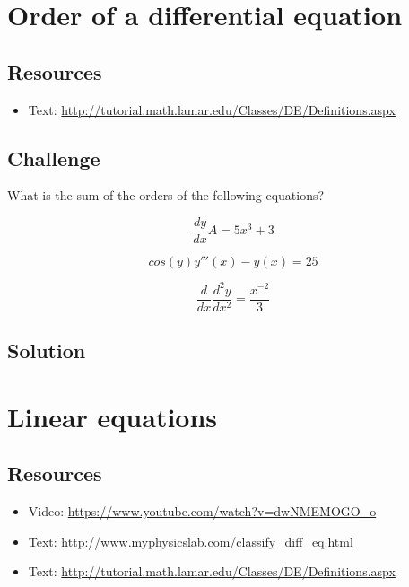 \section{Order of a differential equation}

\subsection*{Resources}
\begin{itemize}
    \item Text: \url{http://tutorial.math.lamar.edu/Classes/DE/Definitions.aspx}
\end{itemize}

\subsection*{Challenge}
What is the sum of the orders of the following equations?

\begin{equation}
    \frac{dy}{dx}A = 5x^3 + 3
\end{equation}

\begin{equation}
    cos(y) y'''(x) - y(x) = 25
\end{equation}

\begin{equation}
    \frac{d}{dx} \frac{d^2 y}{dx^2} = \frac{x^{-2}}{3}
\end{equation}

\subsection*{Solution}
\six{}


\timebox


\newpage

\section{Linear equations}

\subsection*{Resources}
\begin{itemize}
    \item Video: \url{https://www.youtube.com/watch?v=dwNMEMOGO_o}
    \item Text: \url{http://www.myphysicslab.com/classify_diff_eq.html}
    \item Text: \url{http://tutorial.math.lamar.edu/Classes/DE/Definitions.aspx}
\end{itemize}

